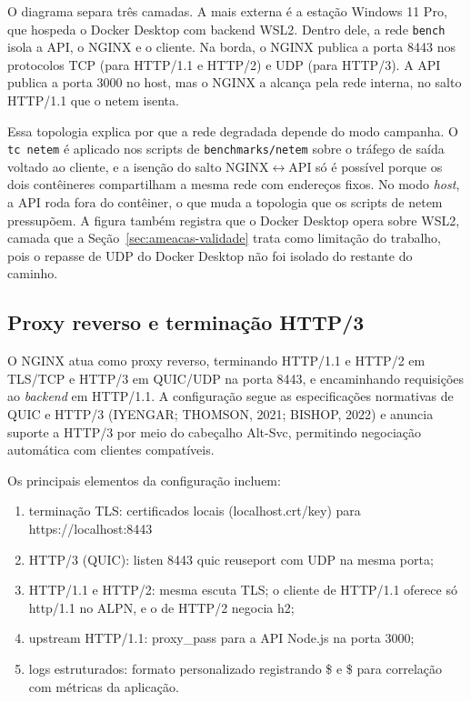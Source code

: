 O diagrama separa três camadas. A mais externa é a estação Windows 11 Pro, que hospeda o Docker Desktop com backend WSL2. Dentro dele, a rede \texttt{bench} isola a API, o NGINX e o cliente. Na borda, o NGINX publica a porta 8443 nos protocolos TCP (para HTTP/1.1 e HTTP/2) e UDP (para HTTP/3). A API publica a porta 3000 no host, mas o NGINX a alcança pela rede interna, no salto HTTP/1.1 que o netem isenta.

Essa topologia explica por que a rede degradada depende do modo campanha. O \texttt{tc netem} é aplicado nos scripts de \texttt{benchmarks/netem} sobre o tráfego de saída voltado ao cliente, e a isenção do salto NGINX$\leftrightarrow$API só é possível porque os dois contêineres compartilham a mesma rede com endereços fixos. No modo \textit{host}, a API roda fora do contêiner, o que muda a topologia que os scripts de netem pressupõem. A figura também registra que o Docker Desktop opera sobre WSL2, camada que a Seção~\ref{sec:ameacas-validade} trata como limitação do trabalho, pois o repasse de UDP do Docker Desktop não foi isolado do restante do caminho.

\subsection{Proxy reverso e terminação HTTP/3}

O NGINX atua como proxy reverso, terminando HTTP/1.1 e HTTP/2 em TLS/TCP e HTTP/3 em QUIC/UDP na porta 8443, e encaminhando requisições ao \textit{backend} em HTTP/1.1. A configuração segue as especificações normativas de QUIC e HTTP/3 (IYENGAR; THOMSON, 2021; BISHOP, 2022) e anuncia suporte a HTTP/3 por meio do cabeçalho Alt-Svc, permitindo negociação automática com clientes compatíveis.

Os principais elementos da configuração incluem:

\begin{enumerate}[label=\alph*)]
\item terminação TLS: certificados locais (localhost.crt/key) para https://localhost:8443
\item HTTP/3 (QUIC): listen 8443 quic reuseport com UDP na mesma porta;
\item HTTP/1.1 e HTTP/2: mesma escuta TLS; o cliente de HTTP/1.1 oferece só http/1.1 no ALPN, e o de HTTP/2 negocia h2;
\item upstream HTTP/1.1: proxy\_pass para a API Node.js na porta 3000;
\item logs estruturados: formato personalizado registrando \$ e \$ para correlação com métricas da aplicação.
\end{enumerate}

